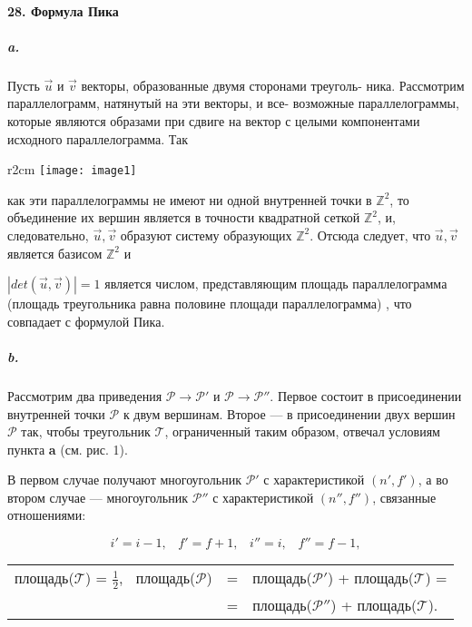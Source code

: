 {\paragraph{28. Формула Пика}

\subparagraph{a.} Пусть $\vec{u}$ и $\vec{v}$ векторы, образованные двумя сторонами треуголь-
ника. Рассмотрим параллелограмм, натянутый на эти векторы, и все-
возможные параллелограммы, которые являются образами при сдвиге
на вектор с целыми компонентами исходного параллелограмма. Так
\begin{wrapfigure}{r}{2cm}
\texttt{[image: image1]}
\end{wrapfigure}
как эти параллелограммы не имеют ни одной 
внутренней точки в $\mathbb {Z}^{2}$, то объединение их вершин 
является в точности квадратной сеткой $\mathbb {Z}^{2}$, и, 
следовательно, ${\vec{u},\vec{v}}$ образуют систему образующих $\mathbb {Z}^{2}$. 
Отсюда следует, что ${\vec{u},\vec{v}}$ является базисом $\mathbb {Z}^{2}$ и




$|det(\vec{u},\vec{v})| = 1$ является числом, представляющим площадь параллелограмма (площадь треугольника равна половине площади параллелограмма) , что совпадает с формулой Пика.

\subparagraph{b.} Рассмотрим два приведения $\mathcal{P} \rightarrow \mathcal{P}'$ и $\mathcal{P} \rightarrow \mathcal{P}''$. Первое состоит в присоединении внутренней точки $\mathcal{P}$ к двум вершинам. Второе --- в присоединении двух вершин $\mathcal{P}$ так, чтобы треугольник $\mathcal{T}$, ограниченный таким образом, отвечал условиям пункта {\bf a} (см. рис. 1).

В первом случае получают многоугольник $\mathcal{P}'$ с характеристикой $(n',f')$, а во втором случае — многоугольник $\mathcal{P}''$ с характеристикой $(n'',f'')$, связанные отношениями:

\begin{equation*}
i' = i - 1,\;\;\; f' = f + 1,\;\;\; i'' = i,\;\;\; f'' = f - 1,
\end{equation*}

\begin{tabular}{ccl} 
площадь($\mathcal{T}$) = $\frac{1}{2}$,$\;\;$ площадь($\mathcal{P}$) &=& площадь($\mathcal{P}'$) + площадь($\mathcal{T}$) = \\
                                                       &=& площадь($\mathcal{P}''$) + площадь($\mathcal{T}$).
\end{tabular} 

}
